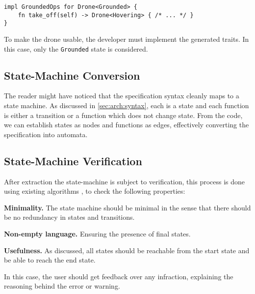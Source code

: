 \begin{listing}
    \centering
    \begin{verbatim}
impl GroundedOps for Drone<Grounded> {
    fn take_off(self) -> Drone<Hovering> { /* ... */ }
}
    \end{verbatim}
    \caption{
        To make the drone usable, the developer must implement the generated traits.
        In this case, only the \texttt{Grounded} state is considered.
    }
    \label{lst:dsl-typestate-impl}
\end{listing}

\subsection{State-Machine Conversion}
The reader might have noticed that the specification syntax cleanly maps to a state machine.
As discussed in \autoref{sec:arch:syntax}, each  is a state and each function is either a transition or a function which does not change state.
From the code, we can establish states as nodes and functions as edges,
effectively converting the specification into automata.

\subsection{State-Machine Verification}\label{sec:arch:fsm-verification}
After extraction the state-machine is subject to verification,
this process is done using existing algorithms \autocite{Hopcroft2013}, to check the following properties:
\begin{compactitem}
    \item \textbf{Minimality.} The state machine should be minimal in the sense that there should be no redundancy in states and transitions.
    \item \textbf{Non-empty language.} Ensuring the presence of final states.
    \item \textbf{Usefulness.} As discussed, all states should be reachable from the start state and be able to reach the end state.
\end{compactitem}
In this case, the user should get feedback over any infraction,
explaining the reasoning behind the error or warning.

